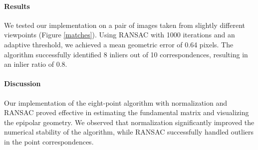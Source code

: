 \paragraph{Results} We tested our implementation on a pair of images taken from slightly different viewpoints (Figure \ref{matches}). Using RANSAC with 1000 iterations and an adaptive threshold, we achieved a mean geometric error of 0.64 pixels. The algorithm successfully identified 8 inliers out of 10 correspondences, resulting in an inlier ratio of 0.8.

\paragraph{Discussion} Our implementation of the eight-point algorithm with normalization and RANSAC proved effective in estimating the fundamental matrix and visualizing the epipolar geometry. We observed that normalization significantly improved the numerical stability of the algorithm, while RANSAC successfully handled outliers in the point correspondences.